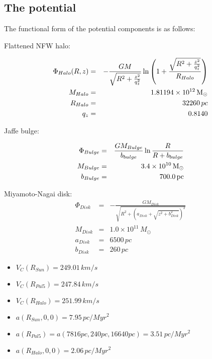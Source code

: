 \subsection{The potential}

The functional form of the potential components is as follows:

Flattened NFW halo:

\begin{eqnarray}
  \Phi_{Halo}(R, z) &=& -\frac{GM}{\sqrt{R^2+\frac{z^2}{q_z^2}}}\ln\left(1+\frac{\sqrt{R^2+\frac{z^2}{q_z^2}}}{R_{Halo}} \right)\\
  M_{Halo} &=& 1.81194\times 10^{12}\mbox{$\,{\rm M}_\odot$}\\
  R_{Halo} &=& 32260\,pc\\
  q_z &=& 0.8140
\end{eqnarray}

Jaffe bulge:

\begin{eqnarray}
  \Phi_{Bulge} &=& \frac{GM_{Bulge}}{b_{bulge}}\ln{\frac{R}{R+b_{bulge}}}\\
  M_{Bulge} &=& 3.4\times 10^{10}\mbox{$\,{\rm M}_\odot$}\\
  b_{Bulge} &=& 700.0\,\mbox{pc}
\end{eqnarray}

Miyamoto-Nagai disk:
\begin{eqnarray}
  \Phi_{Disk} &=& -\frac{GM_{Disk}}{\sqrt{R^2+\left(a_{Disk}+\sqrt{z^2+b_{Disk}^2}\right)^2}}\\
  M_{Disk} &=& 1.0\times 10^{11}\,M_{\odot}\\
  a_{Disk} &=& 6500\,pc\\
  b_{Disk} &=& 260\,pc
\end{eqnarray}

\begin{itemize}
  \item $V_C(R_{Sun}) = 249.01\,km/s$
  \item $V_C(R_{Pal5}) = 247.84\,km/s$
  \item $V_C(R_{Halo}) = 251.99\,km/s$
  \item $a(R_{Sun}, 0, 0) = 7.95\,pc/Myr^2$
  \item $a(R_{Pal5}) = a(7816 pc, 240 pc, 16640 pc) = 3.51\,pc/Myr^2$
  \item $a(R_{Halo}, 0, 0) = 2.06\,pc/Myr^2$
\end{itemize}


